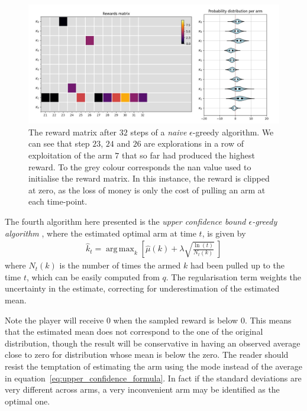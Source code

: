 \documentclass[]{scrartcl}
\DeclareMathOperator*{\argmax}{arg\,max}
\theoremstyle{definition}
\begin{document}
\begin{figure}[h]
    \hspace{-1cm}
    \includegraphics[width=17cm]{figures/step_32.jpg}
    \caption{The reward matrix after $32$ steps of a \emph{naive} $\epsilon$-greedy algorithm. We can see that step $23$, $24$ and $26$ are explorations in a row of exploitation of the arm $7$ that so far had produced the highest reward. To the grey colour corresponds the nan value used to initialise the reward matrix. In this instance, the reward is clipped at zero, as the loss of money is only the cost of pulling an arm at each time-point.}
    \label{fig:step_32}
\end{figure}

The fourth algorithm here presented is the \emph{upper confidence bound $\epsilon$-greedy algorithm} \cite{sutton2018reinforcement}, where the estimated optimal arm at time $t$, is given by
\begin{align}\label{eq:upper_confidence_formula}
\hat{k}_t = \argmax_{k} \left[ \hat{\mu}(k) + \lambda \sqrt{ \frac{\ln(t)}{ N_{t}(k) }  } ~\right]
\end{align}
where $N_{t}(k)$ is the number of times the armed $k$ had been pulled up to the time $t$, which can be easily computed from $q$. The regularisation term weights the uncertainty in the estimate, correcting for underestimation of the estimated mean.

Note the player will receive $0$ when the sampled reward is below $0$. This means that the estimated mean does not correspond to the one of the original distribution, though the result will be conservative in having an observed average close to zero for distribution whose mean is below the zero. The reader should resist the temptation of estimating the arm using the mode instead of the average in equation~\ref{eq:upper_confidence_formula}. In fact if the standard deviations are very different across arms, a very inconvenient arm may be identified as the optimal one.
\end{document}
